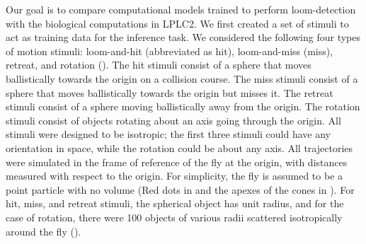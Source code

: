 \documentclass[pdftex,9pt,lineno]{elife}
\begin{document}
Our goal is to compare computational models trained to perform loom-detection with the biological computations in LPLC2. We first created a set of stimuli to act as training data for the inference task. We considered the following four types of motion stimuli: loom-and-hit (abbreviated as hit), loom-and-miss (miss), retreat, and rotation (). The hit stimuli consist of a sphere that moves ballistically towards the origin on a collision course. The miss stimuli consist of a sphere that moves ballistically towards the origin but misses it. The retreat stimuli consist of a sphere moving ballistically away from the origin. The rotation stimuli consist of objects rotating about an axis going through the origin. All stimuli were designed to be isotropic; the first three stimuli could have any orientation in space, while the rotation could be about any axis. All trajectories were simulated in the frame of reference of the fly at the origin, with distances measured with respect to the origin. For simplicity, the fly is assumed to be a point particle with no volume (Red dots in  and the apexes of the cones in ). For hit, miss, and retreat stimuli, the spherical object has unit radius, and for the case of rotation, there were 100 objects of various radii scattered isotropically around the fly ().
\end{document}
